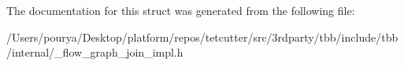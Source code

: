 The documentation for this struct was generated from the following file\+:\begin{DoxyCompactItemize}
\item 
/\+Users/pourya/\+Desktop/platform/repos/tetcutter/src/3rdparty/tbb/include/tbb/internal/\+\_\+flow\+\_\+graph\+\_\+join\+\_\+impl.\+h\end{DoxyCompactItemize}
